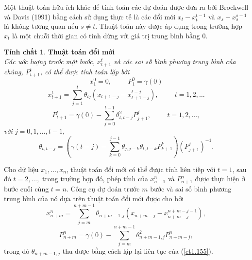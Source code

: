 \documentclass[12pt, a4paper,oneside]{book}
\theoremstyle{definition}
\newtheorem{tc}[theo]{Tính chất}
\begin{document}
Một thuật toán hữu ích khác để tính toán các dự đoán được đưa ra bởi Brockwell và Davis (1991) bằng cách sử dụng thực tế là các đổi mới $x_{t} - x_{t}^{t-1}$ và $x_{s} - x_{s}^{s-1}$ là không tương quan nếu $s \neq t$. Thuật toán này được áp dụng trong trường hợp $x_{t}$ là một chuỗi thời gian có tính dừng với giá trị trung bình bằng $0$.
\begin{tc}\cite{1} \textbf{Thuật toán đổi mới}\\
	\textit{Các ước lượng trước một bước, $x_{t+1}^{t}$ và các sai số bình phương trung bình của chúng, $P_{t+1}^{t}$, có thể được tính toán lặp bởi
		$$x_{1}^{0}=0, \hspace{1cm} P_{1}^{0} =\gamma(0) $$
		\begin{equation}
		x_{t+1}^{t} = \sum_{j=1}^{t}\theta_{tj}(x_{t+1-j} - x_{t+1-j}^{t-j}), \hspace{1cm} t= 1,2, \dots \label{ct1.153}
		\end{equation}	
		\begin{equation}
		P_{t+1}^{t} = \gamma(0) - \sum_{j=0}^{t-1}\theta^{2}_{t,t-j}P_{j+1}^{j}, \hspace{1cm}  t=1, 2, \dots,\label{ct1.154}
		\end{equation}
		với $j=0, 1, \dots, t-1,$
		\begin{equation}
		\theta_{t,t-j}= (\gamma(t-j) - \sum_{k=0}^{j-1}\theta_{j,j-k}\theta_{t,t-k}P_{k+1}^{k})(P_{j+1}^{j})^{-1}.\label{ct1.155}
		\end{equation}}
\end{tc}

Cho dữ liệu $x_{1}, \dots, x_{n}$, thuật toán đổi mới có thể được tính liên tiếp với $t = 1$, sau đó $t = 2, \dots,$ trong trường hợp đó, phép tính của $x^{n}_{n+1}$ và $P^{n}_{n+1}$ được thực hiện ở bước cuối cùng $t = n$. Công cụ dự đoán trước $m$ bước và sai số bình phương trung bình của nó dựa trên thuật toán đổi mới được cho bởi
\begin{equation}
x_{n+m}^{n} = \sum_{j=m}^{n+m-1}\theta_{n+m-1,j}(x_{n+m-j}- x^{n+m-j-1}_{n+m-j}), \label{ct1.156}
\end{equation}
\begin{equation}
P_{n+m}^{n}=  \gamma(0) - \sum_{j=m}^{n+m-1}\theta^{2}_{n+m-1,j}P_{n+m-j}^{n}, \label{ct1.157}
\end{equation}	
trong đó $\theta_{n+m-1,j}$ thu được bằng cách lặp lại liên tục của (\ref{ct1.155}).
\end{document}
